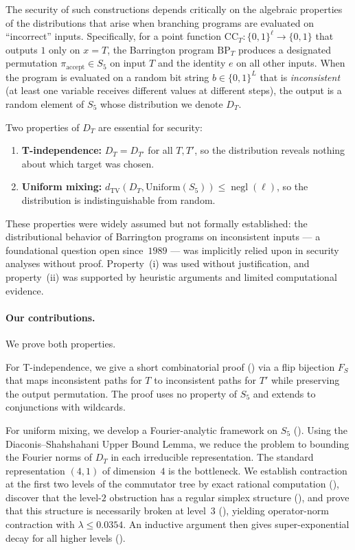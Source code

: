 \documentclass[11pt]{article}
\DeclareMathOperator{\negl}{negl}
\newcommand{\dtv}{d_{\mathrm{TV}}}
\newcommand{\CC}{\mathrm{CC}}
\newcommand{\BP}{\mathrm{BP}}
\begin{document}
The security of such constructions depends critically on the algebraic properties
of the distributions that arise when branching programs are evaluated on
``incorrect'' inputs. Specifically, for a point function $\CC_T : \{0,1\}^\ell
\to \{0,1\}$ that outputs $1$ only on $x = T$, the Barrington program $\BP_T$
produces a designated permutation $\pi_{\mathrm{accept}} \in S_5$ on input $T$
and the identity $e$ on all other inputs. When the program is evaluated on a
random bit string $b \in \{0,1\}^L$ that is \emph{inconsistent} (at least one
variable receives different values at different steps), the output is a random
element of $S_5$ whose distribution we denote $D_T$.

Two properties of $D_T$ are essential for security:

\begin{enumerate}[label=(\roman*)]
\item \textbf{T-independence:} $D_T = D_{T'}$ for all $T, T'$, so the
  distribution reveals nothing about which target was chosen.
\item \textbf{Uniform mixing:} $\dtv(D_T, \mathrm{Uniform}(S_5)) \leq \negl(\ell)$,
  so the distribution is indistinguishable from random.
\end{enumerate}

These properties were widely assumed but not formally established:
the distributional behavior of Barrington programs on inconsistent inputs
--- a foundational question open since~$1989$ --- was implicitly relied upon
in security analyses without proof.
Property~(i) was used without justification, and property~(ii)
was supported by heuristic arguments and limited computational evidence.

\paragraph{Our contributions.}
We prove both properties.

For T-independence, we give a short combinatorial proof ()
via a flip bijection $F_S$ that maps inconsistent paths for $T$ to
inconsistent paths for $T'$ while preserving the output permutation. The proof
uses no property of $S_5$ and extends to conjunctions with wildcards.

For uniform mixing, we develop a Fourier-analytic framework on $S_5$
(). Using the Diaconis--Shahshahani Upper Bound
Lemma, we reduce the problem to bounding the Fourier norms of $D_T$ in
each irreducible representation. The standard representation $(4,1)$ of
dimension~$4$ is the bottleneck. We establish contraction at the first
two levels of the commutator tree by exact rational computation
(), discover that the level-$2$ obstruction
has a regular simplex structure (), and prove that this
structure is necessarily broken at level~$3$ (), yielding
operator-norm contraction with $\lambda \leq 0.0354$. An inductive argument
then gives super-exponential decay for all higher levels ().
\end{document}
